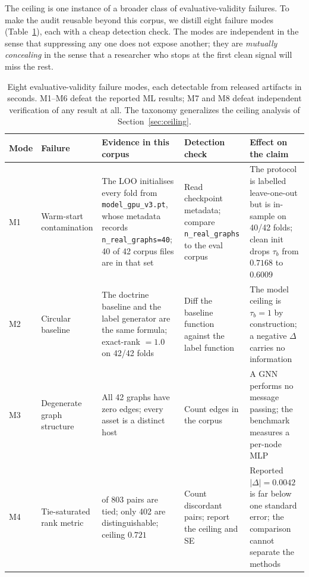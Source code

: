 \documentclass[conference,10pt]{IEEEtran}
\newcommand{\tb}{\tau_b}
\begin{document}
The ceiling is one instance of a broader class of evaluative-validity failures. To make the
audit reusable beyond this corpus, we distill eight failure modes (Table~\ref{tab:modes}), each
with a cheap detection check. The modes are independent in the sense that suppressing any one
does not expose another; they are \emph{mutually concealing} in the sense that a researcher who
stops at the first clean signal will miss the rest.

\begin{table}[t]
\centering
\caption{Eight evaluative-validity failure modes, each detectable from released artifacts in
seconds. M1--M6 defeat the reported ML results; M7 and M8 defeat independent verification of any
result at all. The taxonomy generalizes the ceiling analysis of Section~\ref{sec:ceiling}.}
\label{tab:modes}
\footnotesize
\begin{tabular}{@{}>{\raggedright\arraybackslash}p{0.7cm}>{\raggedright\arraybackslash}p{2.5cm}>{\raggedright\arraybackslash}p{3.3cm}>{\raggedright\arraybackslash}p{3.6cm}>{\raggedright\arraybackslash}p{3.75cm}@{}}
\toprule
\textbf{Mode} & \textbf{Failure} & \textbf{Evidence in this corpus} & \textbf{Detection check} & \textbf{Effect on the claim} \\
\midrule
M1 & Warm-start contamination &
The LOO initialises every fold from \texttt{model\_gpu\_v3.pt}, whose metadata records
\texttt{n\_real\_graphs=40}; 40 of 42 corpus files are in that set &
Read checkpoint metadata; compare \texttt{n\_real\_graphs} to the eval corpus &
The protocol is labelled leave-one-out but is in-sample on 40/42 folds; clean init drops
$\tb$ from $0.7168$ to $0.6009$ \\
\addlinespace
M2 & Circular baseline &
The doctrine baseline and the label generator are the same formula; exact-rank $=1.0$ on
42/42 folds &
Diff the baseline function against the label function &
The model ceiling is $\tb=1$ by construction; a negative $\Delta$ carries no information \\
\addlinespace
M3 & Degenerate graph structure &
All 42 graphs have zero edges; every asset is a distinct host &
Count edges in the corpus &
A GNN performs no message passing; the benchmark measures a per-node MLP \\
\addlinespace
M4 & Tie-saturated rank metric &
401 of 803 pairs are tied; only 402 are distinguishable; ceiling $0.721$ &
Count discordant pairs; report the ceiling and SE &
Reported $|\Delta|=0.0042$ is far below one standard error; the comparison cannot separate the
methods \\

\end{tabular}
\end{table}
\end{document}
